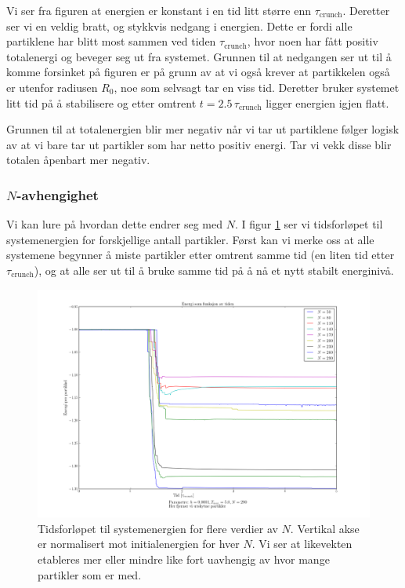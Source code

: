 \documentclass[11pt]{article}
\begin{document}
\begin{multicols}{2}
Vi ser fra figuren at energien er konstant i en tid litt større enn
$\tau_\text{crunch}$. Deretter ser vi en veldig bratt, og stykkvis
nedgang i energien. Dette er fordi alle partiklene har blitt most
sammen ved tiden $\tau_\text{crunch}$, hvor noen har fått positiv
totalenergi og beveger seg ut fra systemet. Grunnen til at nedgangen
ser ut til å komme forsinket på figuren er på grunn av at vi også
krever at partikkelen også er utenfor radiusen $R_0$, noe som selvsagt
tar en viss tid. Deretter bruker systemet litt tid på å stabilisere
og etter omtrent $t = 2.5\,\tau_\text{crunch}$ ligger energien igjen
flatt. 

Grunnen til at totalenergien blir mer negativ når vi tar ut partiklene
følger logisk av at vi bare tar ut partikler som har netto positiv
energi. Tar vi vekk disse blir totalen åpenbart mer negativ. 


\subsubsection{$N$-avhengighet}
Vi kan lure på hvordan dette endrer seg med $N$. I figur
\ref{fig:energy-many-N} ser vi tidsforløpet til systemenergien for
forskjellige antall partikler. Først kan vi merke oss at alle
systemene begynner å miste partikler etter omtrent samme tid (en liten
tid etter $\tau_\text{crunch}$), og at alle ser ut til å bruke samme
tid på å nå et nytt stabilt energinivå. 

\end{multicols}
\begin{figure}[!ht]
  \centering
  \includegraphics[width=\textwidth]{../fig/energy_plot_with_ejection_many_N.png}
  \caption{\label{fig:energy-many-N} Tidsforløpet til systemenergien
    for flere verdier av $N$. Vertikal akse er normalisert mot
    initialenergien for hver $N$. Vi ser at likevekten etableres mer eller
  mindre like fort uavhengig av hvor mange partikler som er med.}
\end{figure}
\end{document}

